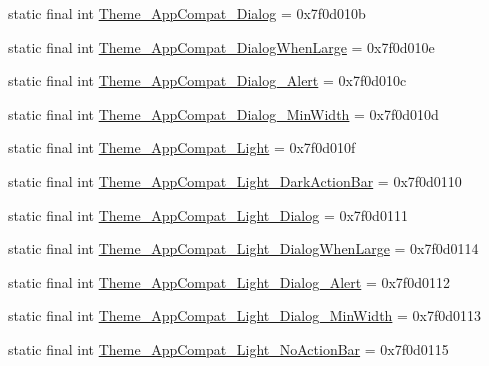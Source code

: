 \begin{DoxyCompactItemize}
\item 
static final int \mbox{\hyperlink{classcom_1_1synnapps_1_1carouselview_1_1_r_1_1style_a8c3b025605140e24605879e3d0bc454f}{Theme\+\_\+\+App\+Compat\+\_\+\+Dialog}} = 0x7f0d010b
\item 
static final int \mbox{\hyperlink{classcom_1_1synnapps_1_1carouselview_1_1_r_1_1style_a25a94be13ab2a546856023466eaab4ae}{Theme\+\_\+\+App\+Compat\+\_\+\+Dialog\+When\+Large}} = 0x7f0d010e
\item 
static final int \mbox{\hyperlink{classcom_1_1synnapps_1_1carouselview_1_1_r_1_1style_ae38f9ac4037313caa24e8d3e8bb464a0}{Theme\+\_\+\+App\+Compat\+\_\+\+Dialog\+\_\+\+Alert}} = 0x7f0d010c
\item 
static final int \mbox{\hyperlink{classcom_1_1synnapps_1_1carouselview_1_1_r_1_1style_ac0cb3cd7e821c4a10978f0f58f5ff995}{Theme\+\_\+\+App\+Compat\+\_\+\+Dialog\+\_\+\+Min\+Width}} = 0x7f0d010d
\item 
static final int \mbox{\hyperlink{classcom_1_1synnapps_1_1carouselview_1_1_r_1_1style_a038ababc1676e742ce2f17a7e00b8ac5}{Theme\+\_\+\+App\+Compat\+\_\+\+Light}} = 0x7f0d010f
\item 
static final int \mbox{\hyperlink{classcom_1_1synnapps_1_1carouselview_1_1_r_1_1style_a146955897d084f47b11903821d388413}{Theme\+\_\+\+App\+Compat\+\_\+\+Light\+\_\+\+Dark\+Action\+Bar}} = 0x7f0d0110
\item 
static final int \mbox{\hyperlink{classcom_1_1synnapps_1_1carouselview_1_1_r_1_1style_a64e5ba3b938320c5cf1deebefe197f1c}{Theme\+\_\+\+App\+Compat\+\_\+\+Light\+\_\+\+Dialog}} = 0x7f0d0111
\item 
static final int \mbox{\hyperlink{classcom_1_1synnapps_1_1carouselview_1_1_r_1_1style_ae8843ce1ffb64b791b42cb073e1c839f}{Theme\+\_\+\+App\+Compat\+\_\+\+Light\+\_\+\+Dialog\+When\+Large}} = 0x7f0d0114
\item 
static final int \mbox{\hyperlink{classcom_1_1synnapps_1_1carouselview_1_1_r_1_1style_a0920f1bb6783a13e2ef7e777a8610b01}{Theme\+\_\+\+App\+Compat\+\_\+\+Light\+\_\+\+Dialog\+\_\+\+Alert}} = 0x7f0d0112
\item 
static final int \mbox{\hyperlink{classcom_1_1synnapps_1_1carouselview_1_1_r_1_1style_abaca215434b7c57a87b66c41b3453649}{Theme\+\_\+\+App\+Compat\+\_\+\+Light\+\_\+\+Dialog\+\_\+\+Min\+Width}} = 0x7f0d0113
\item 
static final int \mbox{\hyperlink{classcom_1_1synnapps_1_1carouselview_1_1_r_1_1style_a7e563ce910c7585dfe3da0d4ef47b154}{Theme\+\_\+\+App\+Compat\+\_\+\+Light\+\_\+\+No\+Action\+Bar}} = 0x7f0d0115

\end{DoxyCompactItemize}
